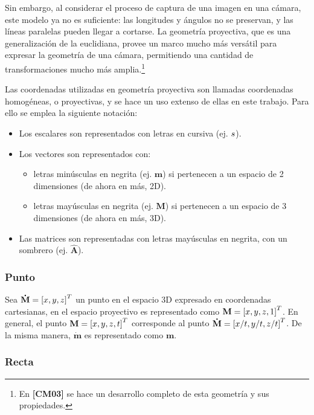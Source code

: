 \documentclass[11pt,a4paper,titlepage]{article}
\newcommand{\Cite}[1]{\textbf{[#1]}}
\newcommand{\Scalar}[1]{\ensuremath{\mathnormal{#1}}}
\newcommand{\Two}[1]{\ensuremath{\mathbf{#1}}}
\newcommand{\Three}[1]{\ensuremath{\mathbf{#1}}}
\newcommand{\Mat}[1]{\ensuremath{\mathbf{\hat{#1}}}}
\newcommand{\TwoCart}[1]{\ensuremath{\mathbf{\dot{#1}}}}
\newcommand{\ThreeCart}[1]{\ensuremath{\mathbf{\dot{#1}}}}
\newcommand{\Vector}[1]{\ensuremath{\left[#1\right]^T}}
\begin{document}
Sin embargo, al considerar el proceso de captura de una imagen en una cámara, este modelo ya no es suficiente: las longitudes y ángulos no se preservan, y las líneas paralelas pueden llegar a cortarse. La geometría proyectiva, que es una generalización de la euclidiana, provee un marco mucho más versátil para expresar la geometría de una cámara, permitiendo una cantidad de transformaciones mucho más amplia.\footnote{En \Cite{CM03} se hace un desarrollo completo de esta geometría y sus propiedades.}

Las coordenadas utilizadas en geometría proyectiva son llamadas coordenadas homogéneas, o proyectivas, y se hace un uso extenso de ellas en este trabajo. Para ello se emplea la siguiente notación:

\begin{itemize}
	\item Los escalares son representados con letras en cursiva (ej. \Scalar{s}).
	\item Los vectores son representados con:
	\begin{itemize}
		\item letras minúsculas en negrita (ej. \Two{m}) si pertenecen a un espacio de 2 dimensiones (de ahora en más, 2D).
		\item letras mayúsculas en negrita (ej. \Three{M}) si pertenecen a un espacio de 3 dimensiones (de ahora en más, 3D).
	\end{itemize}
	\item Las matrices son representadas con letras mayúsculas en negrita, con un sombrero (ej. \Mat{A}).
\end{itemize}

\subsubsection{Punto}

Sea $\ThreeCart{M} = \Vector{\Scalar{x}, \Scalar{y}, \Scalar{z}}$ un punto en el espacio 3D expresado en coordenadas cartesianas, en el espacio proyectivo es representado como $\Three{M} = \Vector{\Scalar{x}, \Scalar{y}, \Scalar{z}, 1}$. En general, el punto $\Three{M} = \Vector{\Scalar{x}, \Scalar{y}, \Scalar{z}, \Scalar{t}}$ corresponde al punto $\ThreeCart{M} = \Vector{\Scalar{x}/\Scalar{t}, \Scalar{y}/\Scalar{t}, \Scalar{z}/\Scalar{t}}$. De la misma manera, \TwoCart{m} es representado como \Two{m}.

\subsubsection{Recta}
 
\end{document}
